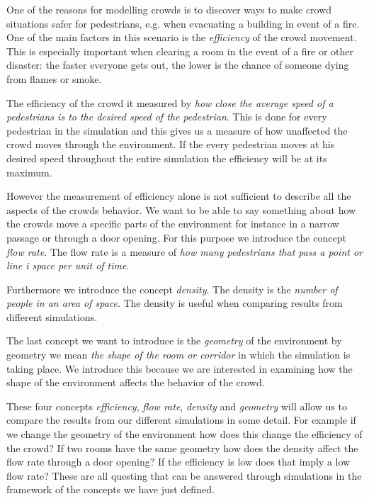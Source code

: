 One of the reasons for modelling crowds is to discover ways to make crowd 
situations safer for pedestrians, e.g. when evacuating a building in event of 
a fire. One of the main factors in this scenario is the \emph{efficiency} of 
the crowd movement. This is especially important when clearing a room in the 
event of a fire or other disaster: the faster everyone gets out, the lower is 
the chance of someone dying from flames or smoke.

The efficiency of the crowd it measured by \emph{how close the average speed 
of a pedestrians is to the desired speed of the pedestrian}. This is done for 
every pedestrian in the simulation and this gives us a measure of how unaffected 
the crowd moves through the environment. If the every pedestrian moves at his 
desired speed throughout the entire simulation the efficiency will be at its 
maximum.

However the measurement of efficiency alone is not sufficient to describe all 
the aspects of the crowds behavior. We want to be able to say something about 
how the crowds move a specific parts of the environment for instance in a 
narrow passage or through a door opening. For this purpose we introduce the 
concept \emph{flow rate}. The flow rate is a measure of \emph{how many pedestrians 
that pass a point or line i space per unit of time}.

Furthermore we introduce the concept \emph{density}. The density is the \emph{number 
of people in an area of space}. The density is useful when comparing results from 
different simulations. 

The last concept we want to introduce is the \emph{geometry} of the environment 
by geometry we mean \emph{the shape of the room or corridor} in which the simulation 
is taking place. We introduce this because we are interested in examining how 
the shape of the environment affects the behavior of the crowd.

These four concepts \emph{efficiency}, \emph{flow rate}, \emph{density} and 
\emph{geometry} will allow us to compare the results from our different simulations 
in some detail. For example if we change the geometry of the environment how does 
this change the efficiency of the crowd? If two rooms have the same geometry 
how does the density affect the flow rate through a door opening? If the efficiency 
is low does that imply a low flow rate? These are all questing that can be answered 
through simulations in the framework of the concepts we have just defined.    

